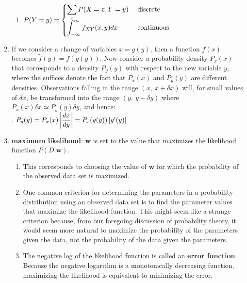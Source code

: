 \begin{enumerate}
\begin{enumerate}
        \item
        $
            P(Y=y) =
            \begin{cases}
                \displaystyle\sum_x P(X=x, Y=y) & \text{ discrete} \\[0.2cm]
                \displaystyle\int_{-\infty}^\infty f_{XY}(x,y)dx & \text{ continuous} \\
            \end{cases}
        $
        \hfill \cite{geeksforgeeks/engineering-mathematics/marginal-probability}
    \end{enumerate}

    \item If we consider a change of variables $x = g(y)$, then a function $f (x)$ becomes $\tilde{f} (y) = f (g(y))$.
    Now consider a probability density $P_x(x)$ that corresponds to a density $P_y (y)$ with respect to the new variable $y$, where the suffices denote the fact that $P_x(x)$ and $P_y (y)$ are different densities.
    Observations falling in the range $(x,\ x + \delta x)$ will, for small values of $\delta x$, be transformed into the range $(y,\ y + \delta y)$ where $P_x(x)\delta x \simeq P_y (y)\delta y$, and hence:
    \hfill \cite{ml/book/Pattern-Recognition-And-Machine-Learning/Christopher-M-Bishop}
    \\[0.2cm]
    .\hfill
    $
        P_y(y)
        = P_x(x) \left| \dfrac{dx}{dy} \right|
        = P_x(g(y)) \left| g^\prime(y) \right|
    $
    \hfill \cite{ml/book/Pattern-Recognition-And-Machine-Learning/Christopher-M-Bishop}

    \item \textbf{maximum likelihood}: $\bm{w}$ is set to the value that maximizes the likelihood function $P(D|\bm{w})$.
    \begin{enumerate}
        \item This corresponds to choosing the value of $\bm{w}$ for which the probability of the observed data set is maximized.
        \hfill \cite{ml/book/Pattern-Recognition-And-Machine-Learning/Christopher-M-Bishop}
    
        \item One common criterion for determining the parameters in a probability distribution using an observed data set is to find the parameter values that maximize the likelihood function. 
        This might seem like a strange criterion because, from our foregoing discussion of probability theory, it would seem more natural to maximize the probability of the parameters given the data, not the probability of the data given the parameters.
        \hfill \cite{ml/book/Pattern-Recognition-And-Machine-Learning/Christopher-M-Bishop}
    
        \item The negative log of the likelihood function is called an \textbf{error function}.
        Because the negative logarithm is a monotonically decreasing function, maximizing the likelihood is equivalent to minimizing the error.
        \hfill \cite{ml/book/Pattern-Recognition-And-Machine-Learning/Christopher-M-Bishop}
    \end{enumerate}

\end{enumerate}
